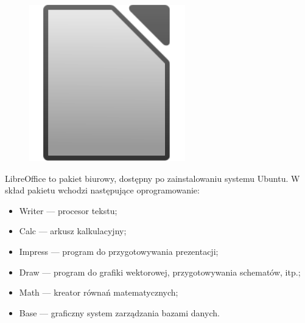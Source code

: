 \begin{figure}
	\vspace{-10pt}
	\includegraphics[width=\linewidth]{images/ikony_libreoffice.png}
\end{figure}

LibreOffice to pakiet biurowy, dostępny po zainstalowaniu systemu Ubuntu. W skład pakietu wchodzi następujące oprogramowanie:
\begin{itemize}
\item \textcolor{ubuntu_orange}{Writer} --- procesor tekstu;
\item \textcolor{ubuntu_orange}{Calc} --- arkusz kalkulacyjny;
\item \textcolor{ubuntu_orange}{Impress} --- program do przygotowywania prezentacji;
\item \textcolor{ubuntu_orange}{Draw} --- program do grafiki wektorowej, przygotowywania schematów, itp.;
\item \textcolor{ubuntu_orange}{Math} --- kreator równań matematycznych;
\item \textcolor{ubuntu_orange}{Base} --- graficzny system zarządzania bazami danych.
\end{itemize}
